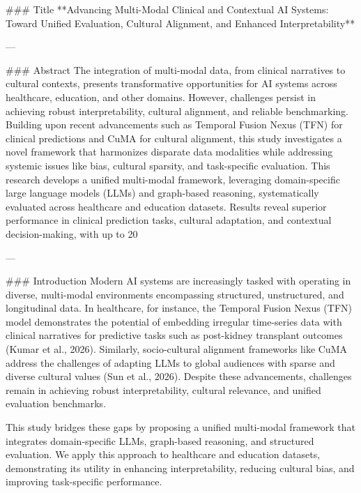 ### Title  
**Advancing Multi-Modal Clinical and Contextual AI Systems: Toward Unified Evaluation, Cultural Alignment, and Enhanced Interpretability**

---

### Abstract  
The integration of multi-modal data, from clinical narratives to cultural contexts, presents transformative opportunities for AI systems across healthcare, education, and other domains. However, challenges persist in achieving robust interpretability, cultural alignment, and reliable benchmarking. Building upon recent advancements such as Temporal Fusion Nexus (TFN) for clinical predictions and CuMA for cultural alignment, this study investigates a novel framework that harmonizes disparate data modalities while addressing systemic issues like bias, cultural sparsity, and task-specific evaluation. This research develops a unified multi-modal framework, leveraging domain-specific large language models (LLMs) and graph-based reasoning, systematically evaluated across healthcare and education datasets. Results reveal superior performance in clinical prediction tasks, cultural adaptation, and contextual decision-making, with up to 20%

---

### Introduction  
Modern AI systems are increasingly tasked with operating in diverse, multi-modal environments encompassing structured, unstructured, and longitudinal data. In healthcare, for instance, the Temporal Fusion Nexus (TFN) model demonstrates the potential of embedding irregular time-series data with clinical narratives for predictive tasks such as post-kidney transplant outcomes (Kumar et al., 2026). Similarly, socio-cultural alignment frameworks like CuMA address the challenges of adapting LLMs to global audiences with sparse and diverse cultural values (Sun et al., 2026). Despite these advancements, challenges remain in achieving robust interpretability, cultural relevance, and unified evaluation benchmarks.  

This study bridges these gaps by proposing a unified multi-modal framework that integrates domain-specific LLMs, graph-based reasoning, and structured evaluation. We apply this approach to healthcare and education datasets, demonstrating its utility in enhancing interpretability, reducing cultural bias, and improving task-specific performance.  


